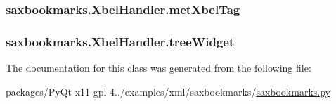 \subsubsection[{met\+Xbel\+Tag}]{\setlength{\rightskip}{0pt plus 5cm}saxbookmarks.\+Xbel\+Handler.\+met\+Xbel\+Tag}\label{classsaxbookmarks_1_1XbelHandler_a5d769e61aaebe56d094c0d0ef6e7c80a}
\hypertarget{classsaxbookmarks_1_1XbelHandler_a9f30b27e65d71268048d0f88d9bb2e0f}{}
\subsubsection[{tree\+Widget}]{\setlength{\rightskip}{0pt plus 5cm}saxbookmarks.\+Xbel\+Handler.\+tree\+Widget}\label{classsaxbookmarks_1_1XbelHandler_a9f30b27e65d71268048d0f88d9bb2e0f}


The documentation for this class was generated from the following file\+:\begin{DoxyCompactItemize}
\item 
packages/\+Py\+Qt-\/x11-\/gpl-\/4../examples/xml/saxbookmarks/\hyperlink{saxbookmarks_8py}{saxbookmarks.\+py}\end{DoxyCompactItemize}
